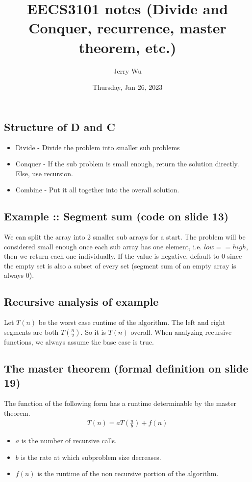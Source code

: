 \documentclass[12pt]{article}
\title{EECS3101 notes (Divide and Conquer, recurrence, master theorem, etc.)}
\author{Jerry Wu}
\date{Thursday, Jan 26, 2023}
\begin{document}
\maketitle

\subsection*{Structure of D and C}
\begin{itemize}
    \item Divide - Divide the problem into smaller sub problems
    \item Conquer - If the sub problem is small enough, return the solution directly. Else, use recursion.
    \item Combine - Put it all together into the overall solution.
\end{itemize}

\subsection*{Example :: Segment sum (code on slide 13)}
We can split the array into 2 smaller sub arrays for a start. The problem will be considered small enough once each sub array has one element, i.e. $low==high$, then we return each one individually. If the value is negative, default to 0 since the empty set is also a subset of every set (segment sum of an empty array is always 0).

\subsection*{Recursive analysis of example}

Let $T(n)$ be the worst case runtime of the algorithm. The left and right segments are both $T(\frac{n}{2})$. So it is $T(n)$ overall. When analyzing recursive functions, we always assume the base case is true.

\subsection*{The master theorem (formal definition on slide 19)}
The function of the following form has a runtime determinable by the master theorem.
\begin{align*}
    T(n)=aT(\frac{n}{b})+f(n)
\end{align*}

\begin{itemize}
    \item $a$ is the number of recursive calls.
    \item $b$ is the rate at which subproblem size decreases.
    \item $f(n)$ is the runtime of the non recursive portion of the algorithm.

\end{itemize}
\end{document}
